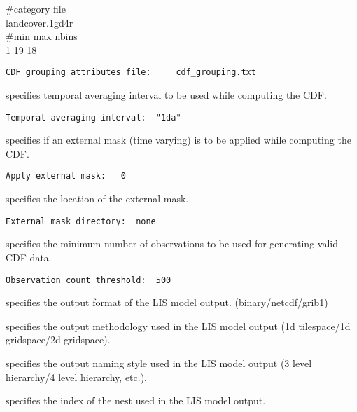  \#category file  \\
 landcover.1gd4r  \\
 \#min max nbins  \\
 1 19 18          \\
 

 \begin{Verbatim}[frame=single]
CDF grouping attributes file:     cdf_grouping.txt
 \end{Verbatim}

 
 specifies temporal averaging interval to be used while computing
 the CDF.
 

 \begin{Verbatim}[frame=single]
Temporal averaging interval:  "1da"
 \end{Verbatim}

 
 specifies if an external mask (time varying) is to be applied
 while computing the CDF.
 

 \begin{Verbatim}[frame=single]
Apply external mask:   0 
 \end{Verbatim}

 
 specifies the location of the external mask.
 

 \begin{Verbatim}[frame=single]
External mask directory:  none
 \end{Verbatim}


 
 specifies the minimum number of observations to be used for generating
 valid CDF data.
 

 \begin{Verbatim}[frame=single]
Observation count threshold:  500
 \end{Verbatim}


 
 specifies the output format of the LIS model output.
 (binary/netcdf/grib1)

 specifies the output methodology used in the LIS model output
 (1d tilespace/1d gridspace/2d gridspace).

 specifies the output naming style used in the LIS model output 
 (3 level hierarchy/4 level hierarchy, etc.).

 specifies the index of the nest used in the LIS model output.

